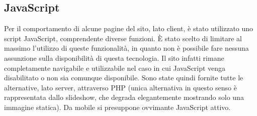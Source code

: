 \begin{center}
\end{center}

\bigskip

\subsection{JavaScript}
Per il comportamento di alcune pagine del sito, lato client, è stato utilizzato uno script JavaScript, comprendente diverse funzioni. È stato scelto di limitare al massimo l’utilizzo di queste funzionalità, in quanto non è possibile fare nessuna assunzione sulla disponibilità di questa tecnologia. Il sito infatti rimane completamente navigabile e utilizzabile nel caso in cui JavaScript venga disabilitato o non sia comunque disponibile. Sono state quindi fornite tutte le alternative, lato server, attraverso PHP (unica alternativa in questo senso è rappresentata dallo slideshow, che degrada elegantemente mostrando solo una immagine statica).
Da mobile si presuppone ovvimante JavaScript attivo. \\

